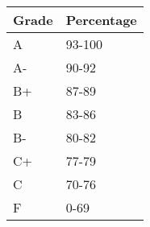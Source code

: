 \documentclass[10pt]{article}
\begin{document}
{ 
\bigskip
{}
\begin{table}[htp]
\begin{tabular}{ll}
Grade & Percentage \\
\hline
A & 93-100 \\
A- & 90-92 \\
B+ & 87-89 \\
B & 83-86 \\
B- & 80-82 \\
C+ & 77-79 \\
C & 70-76 \\
F & 0-69 \\
\end{tabular}
\end{table}%
  }
  
\end{document}

